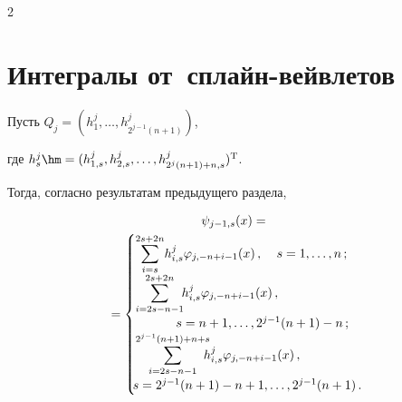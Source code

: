 \begin{multicols}{2}
\section{Интегралы от~сплайн-вейвлетов}





Пусть ${Q}_j=({h}_1^j,\dots,{h}_{2^{j-1}(n+1)}^j)$, 


где ${h}_s^j\hm=(h_{1,s}^j,h_{2,s}^j,\dots,h_{2^j (n+1)+n,s}^j)^{\mathrm{T}}$. 


Тогда,   согласно результатам предыдущего раздела,





\noindent


\begin{multline}


\label{U31}


\psi_{j-1,s}(x)={}\\


{}=


\begin{cases}


\displaystyle\sum\limits_{i=s}^{2s+2n} \! h_{i,s}^j\varphi_{j,-n+i-1}(x)\,,&\hspace*{-10mm}


s=1,\dots,n\,;\\


\displaystyle\sum\limits_{i=2s-n-1}^{2s+2n}\!\!


h_{i,s}^j\varphi_{j,-n+i-1}(x)\,,&\\ 


&\hspace*{-38mm}s=n+1,\dots,2^{j-1}(n+1)-n\,;


\\




\displaystyle\sum\limits_{i=2s-n-1}^{2^{j-1}(n+1)+n+s}\!\!\!\!


h_{i,s}^j


\varphi_{j,-n+i-1}(x)\,,&\\


&\hspace*{-50mm}s=2^{j-1}(n+1)-n+1,\dots,2^{j-1}(n+1)\,.


\end{cases}


\end{multline}









\end{multicols}
